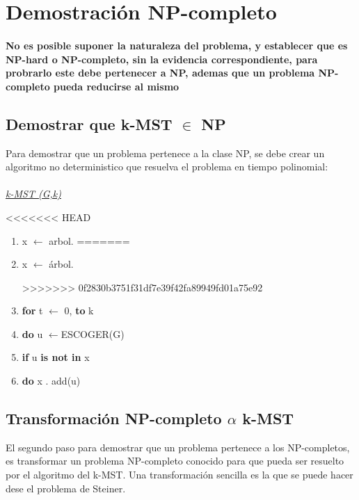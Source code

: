 \documentclass[spanish,12pt]{elsarticle}
\newcommand{\blank}[1]{\hspace*{#1}}
\begin{document}
\section{Demostración NP-completo}
\paragraph{\textnormal{No es posible suponer la naturaleza del problema, y establecer que es NP-hard o NP-completo, sin la evidencia correspondiente, para probrarlo este debe pertenecer a NP, ademas que un problema NP-completo pueda reducirse al mismo}}
\subsection{Demostrar que k-MST $\in$ NP}
Para demostrar que un problema pertenece a la clase NP, se debe crear un algoritmo no deterministico que resuelva el problema en tiempo polinomial:\\\\
\textit{\underline{k-MST (G,k)} }

<<<<<<< HEAD
\begin{enumerate}
    \item \textnormal{x $\leftarrow$ arbol.}
=======
    \item \textnormal{x $\leftarrow$ árbol.}
    
>>>>>>> 0f2830b3751f31df7e39f42fa89949fd01a75e92
    \item  \textnormal{\textbf{for} t $\leftarrow$ 0,
    \textbf{to} k}
    \item \textnormal{\blank{1cm}\textbf{do} u $\leftarrow${ESCOGER(G)}}
    \item  \textnormal{\blank{2cm}\textbf{if} u \textbf{is not in} x}
    \item \textnormal{\blank{3cm}\textbf{do} x . add(u)}
\end{enumerate}



\subsection{Transformación NP-completo $\alpha$  k-MST}
El segundo paso para demostrar que un problema pertenece a los NP-completos, es transformar un problema NP-completo conocido para que pueda ser resuelto por el algoritmo del k-MST. Una transformación sencilla es la que se puede hacer dese el problema de Steiner.
\end{document}

